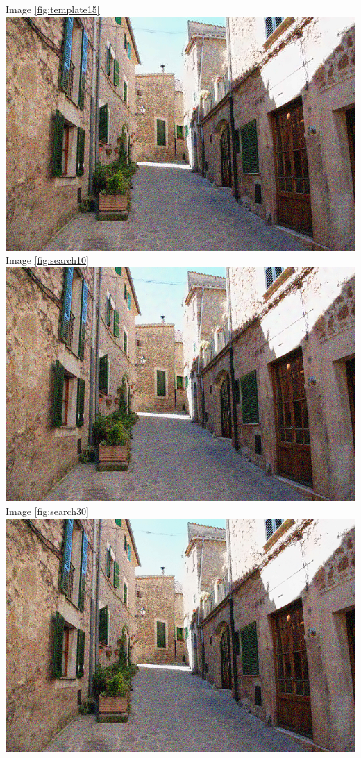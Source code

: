 \documentclass[11pt]{article}
\begin{document}
\begin{appendices}
Image \ref{fig:template15}\\
\includegraphics[width=0.8\linewidth]{template15}
\newpage
Image \ref{fig:search10}\\
\includegraphics[width=0.8\linewidth]{search10}\\
Image \ref{fig:search30}\\
\includegraphics[width=0.8\linewidth]{search30}\\
\end{appendices}
\end{document}
